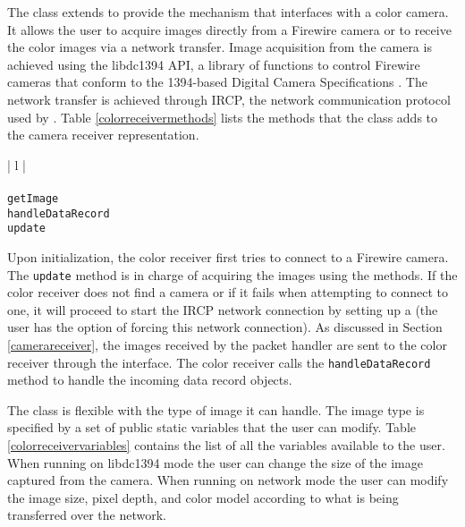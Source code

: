 The \ColorReceiver{} class extends \CameraReceiver{} to provide the mechanism that interfaces with a color 
camera. It allows the user to acquire images directly from a Firewire camera or to receive the color images via a 
network transfer. Image acquisition from the camera is achieved using the libdc1394 API, a library of functions to 
control Firewire cameras that conform to the 1394-based Digital Camera Specifications \cite{libdc1394}. The 
network transfer is achieved through IRCP, the network communication protocol used by \RD{} \cite{IRCP}.
Table \ref{colorreceivermethods} lists the methods that the \ColorReceiver{} class adds to the camera receiver 
representation.

\begin{table}[ht]
\caption{Public methods in the \ColorReceiver{} class }
\begin{center}
\begin{tabular}{| l |}
	\hline 
	 \\
	 \\
	\hline \hline
	\texttt{getImage} \\
	\texttt{handleDataRecord} \\
	\texttt{update} \\
	\hline
\end{tabular}
\end{center}
\label{colorreceivermethods}
\end{table}

Upon initialization, the color receiver first tries to connect to a Firewire camera. The \texttt{up\-date} method
is in charge of acquiring the images using the \DCJavaAcquire{} methods. If the color receiver does not find a 
camera or if it fails when attempting to connect to one, it will proceed to start the IRCP network connection by 
setting up a \ColorPacketHandler{} (the user has the option of forcing this network connection). As discussed in 
Section \ref{camerareceiver}, the images received by the packet handler are sent to the color receiver through 
the \iDataRecordHandler{} interface. The color receiver calls the \texttt{han\-dle\-Da\-ta\-Re\-cord} method to 
handle the incoming data record objects.

The \ColorReceiver{} class is flexible with the type of image it can handle. The image type is specified by a 
set of public static variables that the user can modify. Table \ref{colorreceivervariables} contains the list of all 
the variables available to the user. When running on libdc1394 mode the user can change the size of the image 
captured from the camera. When running on network mode the user can modify the image size, pixel depth, and 
color model according to what is being transferred over the network. 


